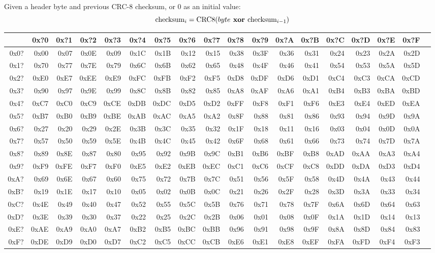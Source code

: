 Given a header byte and previous CRC-8 checksum,
or 0 as an initial value:
\begin{equation*}
\text{checksum}_i = \text{CRC8}(byte\textbf{ xor }\text{checksum}_{i - 1})
\end{equation*}
\begin{table}[h]
{\ttfamily
\begin{tabular}{|r||r|r|r|r|r|r|r|r|r|r|r|r|r|r|r|r|r|}
\hline
 & 0x?0 & 0x?1 & 0x?2 & 0x?3 & 0x?4 & 0x?5 & 0x?6 & 0x?7 & 0x?8 & 0x?9 & 0x?A & 0x?B & 0x?C & 0x?D & 0x?E & 0x?F \\
\hline
0x0? & 0x00 & 0x07 & 0x0E & 0x09 & 0x1C & 0x1B & 0x12 & 0x15 & 0x38 & 0x3F & 0x36 & 0x31 & 0x24 & 0x23 & 0x2A & 0x2D \\
0x1? & 0x70 & 0x77 & 0x7E & 0x79 & 0x6C & 0x6B & 0x62 & 0x65 & 0x48 & 0x4F & 0x46 & 0x41 & 0x54 & 0x53 & 0x5A & 0x5D \\
0x2? & 0xE0 & 0xE7 & 0xEE & 0xE9 & 0xFC & 0xFB & 0xF2 & 0xF5 & 0xD8 & 0xDF & 0xD6 & 0xD1 & 0xC4 & 0xC3 & 0xCA & 0xCD \\
0x3? & 0x90 & 0x97 & 0x9E & 0x99 & 0x8C & 0x8B & 0x82 & 0x85 & 0xA8 & 0xAF & 0xA6 & 0xA1 & 0xB4 & 0xB3 & 0xBA & 0xBD \\
0x4? & 0xC7 & 0xC0 & 0xC9 & 0xCE & 0xDB & 0xDC & 0xD5 & 0xD2 & 0xFF & 0xF8 & 0xF1 & 0xF6 & 0xE3 & 0xE4 & 0xED & 0xEA \\
0x5? & 0xB7 & 0xB0 & 0xB9 & 0xBE & 0xAB & 0xAC & 0xA5 & 0xA2 & 0x8F & 0x88 & 0x81 & 0x86 & 0x93 & 0x94 & 0x9D & 0x9A \\
0x6? & 0x27 & 0x20 & 0x29 & 0x2E & 0x3B & 0x3C & 0x35 & 0x32 & 0x1F & 0x18 & 0x11 & 0x16 & 0x03 & 0x04 & 0x0D & 0x0A \\
0x7? & 0x57 & 0x50 & 0x59 & 0x5E & 0x4B & 0x4C & 0x45 & 0x42 & 0x6F & 0x68 & 0x61 & 0x66 & 0x73 & 0x74 & 0x7D & 0x7A \\
0x8? & 0x89 & 0x8E & 0x87 & 0x80 & 0x95 & 0x92 & 0x9B & 0x9C & 0xB1 & 0xB6 & 0xBF & 0xB8 & 0xAD & 0xAA & 0xA3 & 0xA4 \\
0x9? & 0xF9 & 0xFE & 0xF7 & 0xF0 & 0xE5 & 0xE2 & 0xEB & 0xEC & 0xC1 & 0xC6 & 0xCF & 0xC8 & 0xDD & 0xDA & 0xD3 & 0xD4 \\
0xA? & 0x69 & 0x6E & 0x67 & 0x60 & 0x75 & 0x72 & 0x7B & 0x7C & 0x51 & 0x56 & 0x5F & 0x58 & 0x4D & 0x4A & 0x43 & 0x44 \\
0xB? & 0x19 & 0x1E & 0x17 & 0x10 & 0x05 & 0x02 & 0x0B & 0x0C & 0x21 & 0x26 & 0x2F & 0x28 & 0x3D & 0x3A & 0x33 & 0x34 \\
0xC? & 0x4E & 0x49 & 0x40 & 0x47 & 0x52 & 0x55 & 0x5C & 0x5B & 0x76 & 0x71 & 0x78 & 0x7F & 0x6A & 0x6D & 0x64 & 0x63 \\
0xD? & 0x3E & 0x39 & 0x30 & 0x37 & 0x22 & 0x25 & 0x2C & 0x2B & 0x06 & 0x01 & 0x08 & 0x0F & 0x1A & 0x1D & 0x14 & 0x13 \\
0xE? & 0xAE & 0xA9 & 0xA0 & 0xA7 & 0xB2 & 0xB5 & 0xBC & 0xBB & 0x96 & 0x91 & 0x98 & 0x9F & 0x8A & 0x8D & 0x84 & 0x83 \\
0xF? & 0xDE & 0xD9 & 0xD0 & 0xD7 & 0xC2 & 0xC5 & 0xCC & 0xCB & 0xE6 & 0xE1 & 0xE8 & 0xEF & 0xFA & 0xFD & 0xF4 & 0xF3 \\
\hline
\end{tabular}
}
\end{table}
